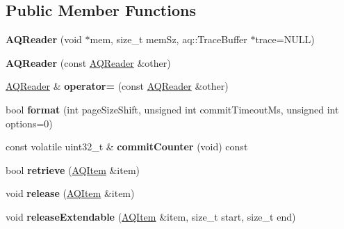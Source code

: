 \subsection*{Public Member Functions}
\begin{DoxyCompactItemize}
\item 
{\bfseries A\+Q\+Reader} (void $\ast$mem, size\+\_\+t mem\+Sz, aq\+::\+Trace\+Buffer $\ast$trace=N\+U\+LL)\hypertarget{class_a_q_reader_a58e6ba2ed65f3b6ea6e324d85662726a}{}\label{class_a_q_reader_a58e6ba2ed65f3b6ea6e324d85662726a}

\item 
{\bfseries A\+Q\+Reader} (const \hyperlink{class_a_q_reader}{A\+Q\+Reader} \&other)\hypertarget{class_a_q_reader_a7f8e630340547a340e5244e7c19dbbc4}{}\label{class_a_q_reader_a7f8e630340547a340e5244e7c19dbbc4}

\item 
\hyperlink{class_a_q_reader}{A\+Q\+Reader} \& {\bfseries operator=} (const \hyperlink{class_a_q_reader}{A\+Q\+Reader} \&other)\hypertarget{class_a_q_reader_a9fa06085b152d9587102216114c13e4a}{}\label{class_a_q_reader_a9fa06085b152d9587102216114c13e4a}

\item 
bool {\bfseries format} (int page\+Size\+Shift, unsigned int commit\+Timeout\+Ms, unsigned int options=0)\hypertarget{class_a_q_reader_ac9bcc041a825dc8f3d57d9644ea65863}{}\label{class_a_q_reader_ac9bcc041a825dc8f3d57d9644ea65863}

\item 
const volatile uint32\+\_\+t \& {\bfseries commit\+Counter} (void) const \hypertarget{class_a_q_reader_a97babb3a8853758a2c37c68ecd27fe3f}{}\label{class_a_q_reader_a97babb3a8853758a2c37c68ecd27fe3f}

\item 
bool {\bfseries retrieve} (\hyperlink{class_a_q_item}{A\+Q\+Item} \&item)\hypertarget{class_a_q_reader_a6746d86b29c04ff19032106323cdef6f}{}\label{class_a_q_reader_a6746d86b29c04ff19032106323cdef6f}

\item 
void {\bfseries release} (\hyperlink{class_a_q_item}{A\+Q\+Item} \&item)\hypertarget{class_a_q_reader_aad5233986e056a2da7f23e282b7a2596}{}\label{class_a_q_reader_aad5233986e056a2da7f23e282b7a2596}

\item 
void {\bfseries release\+Extendable} (\hyperlink{class_a_q_item}{A\+Q\+Item} \&item, size\+\_\+t start, size\+\_\+t end)\hypertarget{class_a_q_reader_a67bfd41350cadc6af749df9132a0901c}{}\label{class_a_q_reader_a67bfd41350cadc6af749df9132a0901c}

\end{DoxyCompactItemize}
